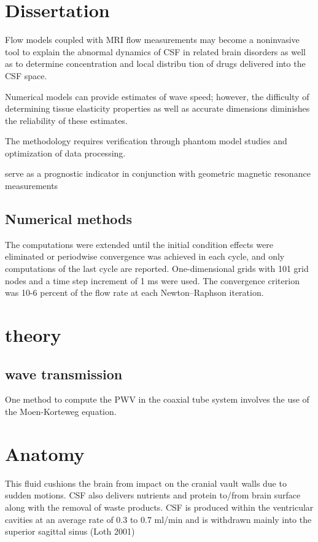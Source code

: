 \documentclass{report}
\begin{document}
\section{Dissertation}
Flow models coupled with MRI
flow measurements may become a noninvasive tool to explain the abnormal dynamics of
CSF in related brain disorders as well as to determine concentration and local distribu
tion
of drugs delivered into the CSF space.

Numerical
models can provide estimates of wave speed; however, the difficulty of
determining tissue elasticity properties as well as accurate dimensions
diminishes the reliability of these estimates.

The methodology requires verification
through phantom model studies and optimization of data processing.

serve as a prognostic indicator in conjunction
with geometric magnetic resonance measurements

\subsection{Numerical methods}
The computations were extended until the initial condition effects
were eliminated or periodwise convergence was achieved in
each cycle, and only computations of the last cycle are reported.
One-dimensional grids with 101 grid
nodes and a time step increment of 1 ms were used.
The convergence
criterion was 10-6 percent of the flow rate at each
Newton–Raphson iteration.

\section{theory}

\subsection{wave transmission}

One method to compute the PWV
in the coaxial tube system involves the use of the Moen-Korteweg
equation.



\section{Anatomy}
This fluid cushions the brain from impact on the cranial vault
walls due to sudden motions. CSF also delivers nutrients and protein
to/from brain surface along with the removal of waste products. CSF is produced within the ventricular cavities at an average rate of 0.3 to 0.7 ml/min and is withdrawn mainly into the superior
sagittal sinus (Loth 2001)
\end{document}
